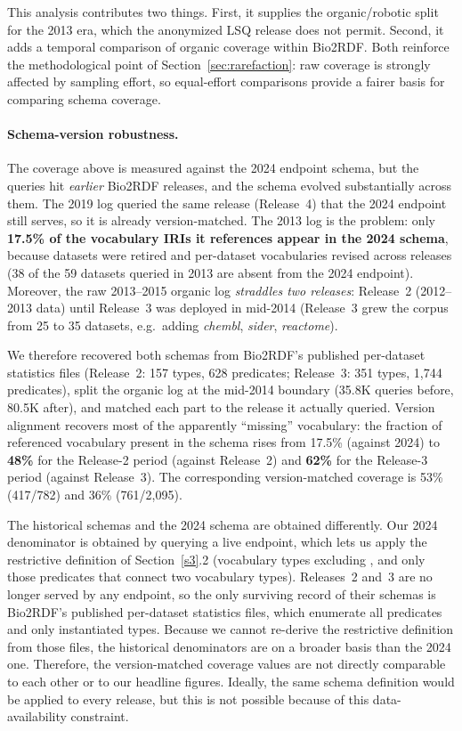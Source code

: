 \documentclass[sw]{iosart2x}
\begin{document}
This analysis contributes two things. First, it supplies the organic/robotic split for the 2013 era, which the anonymized LSQ release does not permit. Second, it adds a temporal comparison of organic coverage within Bio2RDF. Both reinforce the methodological point of Section~\ref{sec:rarefaction}: raw coverage is strongly affected by sampling effort, so equal-effort comparisons provide a fairer basis for comparing schema coverage.

\paragraph{\textbf{Schema-version robustness.}} The coverage above is measured against the 2024 endpoint schema, but the queries hit \emph{earlier} Bio2RDF releases, and the schema evolved substantially across them. The 2019 log queried the same release (Release~4) that the 2024 endpoint still serves, so it is already version-matched. The 2013 log is the problem: only \textbf{17.5\% of the vocabulary IRIs it references appear in the 2024 schema}, because datasets were retired and per-dataset vocabularies revised across releases (38 of the 59 datasets queried in 2013 are absent from the 2024 endpoint). Moreover, the raw 2013--2015 organic log \emph{straddles two releases}: Release~2 (2012--2013 data) until Release~3 was deployed in mid-2014 (Release~3 grew the corpus from 25 to 35 datasets, e.g.\ adding \emph{chembl}, \emph{sider}, \emph{reactome}).

We therefore recovered both schemas from Bio2RDF's published per-dataset statistics files (Release~2: 157 types, 628 predicates; Release~3: 351 types, 1{,}744 predicates), split the organic log at the mid-2014 boundary (35.8K queries before, 80.5K after), and matched each part to the release it actually queried. Version alignment recovers most of the apparently ``missing'' vocabulary: the fraction of referenced vocabulary present in the schema rises from 17.5\% (against 2024) to \textbf{48\%} for the Release-2 period (against Release~2) and \textbf{62\%} for the Release-3 period (against Release~3). The corresponding version-matched coverage is 53\% (417/782) and 36\% (761/2{,}095).

The historical schemas and the 2024 schema are obtained differently. Our 2024 denominator is obtained by querying a live endpoint, which lets us apply the restrictive definition of Section~\ref{s3}.2 (vocabulary types excluding \texttt{}, and only those predicates that connect two vocabulary types). Releases~2 and~3 are no longer served by any endpoint, so the only surviving record of their schemas is Bio2RDF's published per-dataset statistics files, which enumerate all predicates and only instantiated types. Because we cannot re-derive the restrictive definition from those files, the historical denominators are on a broader basis than the 2024 one. Therefore, the version-matched coverage values are not directly comparable to each other or to our headline figures. Ideally, the same schema definition would be applied to every release, but this is not possible because of this data-availability constraint.
\end{document}
